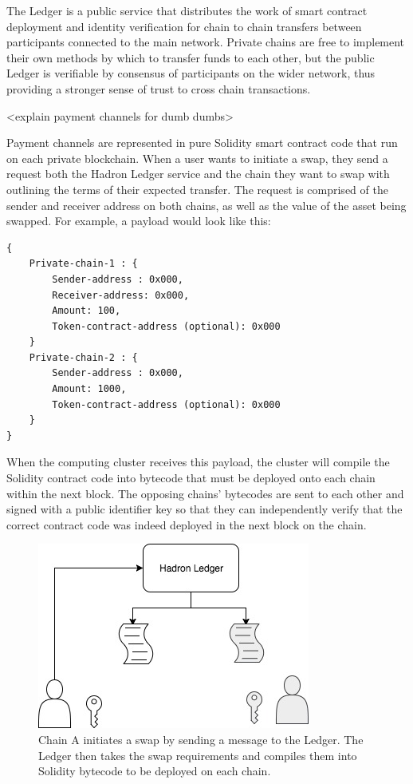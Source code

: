 \documentclass{%
	article}
\begin{document}
The Ledger is a public service that distributes the work of smart contract deployment and identity verification for chain to chain transfers between participants connected to the main network. Private chains are free to implement their own methods by which to transfer funds to each other, but the public Ledger is verifiable by consensus of participants on the wider network, thus providing a stronger sense of trust to cross chain transactions.

<explain payment channels for dumb dumbs>

Payment channels are represented in pure Solidity smart contract code that run on each private blockchain. When a user wants to initiate a swap, they send a request both the Hadron Ledger service and the chain they want to swap with outlining the terms of their expected transfer. The request is comprised of the sender and receiver address on both chains, as well as the value of the asset being swapped. For example, a payload would look like this:

\begin{lstlisting}
{
    Private-chain-1 : {
        Sender-address : 0x000,
        Receiver-address: 0x000,
        Amount: 100,
        Token-contract-address (optional): 0x000
    }
    Private-chain-2 : {
        Sender-address : 0x000,
        Amount: 1000,
        Token-contract-address (optional): 0x000
    }
}
\end{lstlisting}

When the computing cluster receives this payload, the cluster will compile the Solidity contract code into bytecode that must be deployed onto each chain within the next block. The opposing chains’ bytecodes are sent to each other and signed with a public identifier key so that they can independently verify that the correct contract code was indeed deployed in the next block on the chain.

\begin{figure}[htbp!]
\centering
\includegraphics[scale=0.5]{fig1.jpg}
\caption{Chain A initiates a swap by sending a message to the Ledger. The Ledger then takes the swap requirements and compiles them into Solidity bytecode to be deployed on each chain.}
\end{figure}
\end{document}

